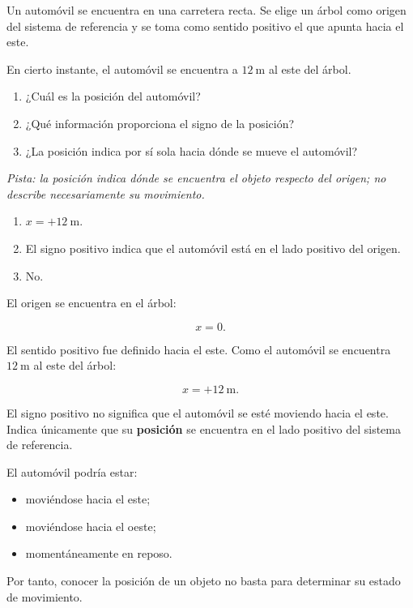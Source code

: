 ﻿\nivelbasico


\begin{ejercicio}
Un automóvil se encuentra en una carretera recta. Se elige un árbol como origen del sistema de referencia y se toma como sentido positivo el que apunta hacia el este.

En cierto instante, el automóvil se encuentra a \(\SI{12}{\meter}\) al este del árbol.

\begin{enumerate}[label=\alph*)]
    \item ¿Cuál es la posición del automóvil?
    \item ¿Qué información proporciona el signo de la posición?
    \item ¿La posición indica por sí sola hacia dónde se mueve el automóvil?
\end{enumerate}

\textit{Pista: la posición indica dónde se encuentra el objeto respecto del origen; no describe necesariamente su movimiento.}
\end{ejercicio}

\begin{respuesta}
\begin{enumerate}[label=\alph*)]
    \item \(x=+\SI{12}{\meter}\).
    \item El signo positivo indica que el automóvil está en el lado positivo del origen.
    \item No.
\end{enumerate}
\end{respuesta}

\begin{explicacion}
El origen se encuentra en el árbol:

\[ x=0. \]

El sentido positivo fue definido hacia el este. Como el automóvil se encuentra \(\SI{12}{\meter}\) al este del árbol:

\[ \boxed{x=+\SI{12}{\meter}}. \]

El signo positivo no significa que el automóvil se esté moviendo hacia el este. Indica únicamente que su \textbf{posición} se encuentra en el lado positivo del sistema de referencia.

El automóvil podría estar:

\begin{itemize}
    \item moviéndose hacia el este;
    \item moviéndose hacia el oeste;
    \item momentáneamente en reposo.
\end{itemize}

Por tanto, conocer la posición de un objeto no basta para determinar su estado de movimiento.
\end{explicacion}


